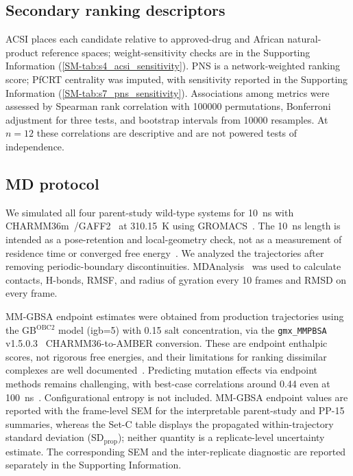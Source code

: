 \documentclass[journal=jcisd8,manuscript=article,layout=traditional]{achemso}
\begin{document}
\subsection{Secondary ranking descriptors}

ACSI places each candidate relative to approved-drug and African natural-product reference spaces; weight-sensitivity checks are in the Supporting Information (\cref{SM-tab:s4_acsi_sensitivity}). PNS is a network-weighted ranking score; PfCRT centrality was imputed, with sensitivity reported in the Supporting Information (\cref{SM-tab:s7_pns_sensitivity}). Associations among metrics were assessed by Spearman rank correlation with \num{100000} permutations, Bonferroni adjustment for three tests, and bootstrap intervals from \num{10000} resamples. At $n=\num{12}$ these correlations are descriptive and are not powered tests of independence.

\subsection{MD protocol}

We simulated all four parent-study wild-type systems for \qty{10}{\ns} with CHARMM36m~\citep{charmm36m_2017}/GAFF2~\citep{wang2004gaff} at \qty{310.15}{\kelvin} using GROMACS~\citep{gromacs_2015,lindahl_2024}. The \qty{10}{\ns} length is intended as a pose-retention and local-geometry check, not as a measurement of residence time or converged free energy~\citep{wei2024structure}. We analyzed the trajectories after removing periodic-boundary discontinuities. MDAnalysis~\citep{mdanalysis_2011} was used to calculate contacts, H-bonds, RMSF, and radius of gyration every \num{10} frames and RMSD on every frame.

MM-GBSA endpoint estimates were obtained from production trajectories using the GB$^{\text{OBC2}}$ model (igb=5) with \qty{0.15}{\molar} salt concentration, via the \texttt{gmx\_MMPBSA} v1.5.0.3~\citep{gmx_mmpbsa_2021} CHARMM36-to-AMBER conversion. These are endpoint enthalpic scores, not rigorous free energies, and their limitations for ranking dissimilar complexes are well documented~\citep{roux2024mmgbsa}. Predicting mutation effects via endpoint methods remains challenging, with best-case correlations around 0.44 even at \qty{100}{\ns}~\citep{yu2022mutation_mmgbsa}. Configurational entropy is not included. MM-GBSA endpoint values are reported with the frame-level SEM for the interpretable parent-study and PP-15 summaries, whereas the Set-C table displays the propagated within-trajectory standard deviation (SD$_{\mathrm{prop}}$); neither quantity is a replicate-level uncertainty estimate. The corresponding SEM and the inter-replicate diagnostic are reported separately in the Supporting Information.
\end{document}
